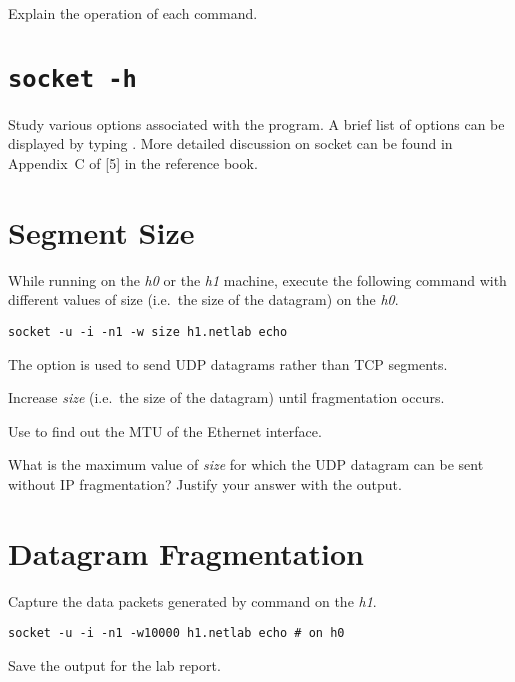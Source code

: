\documentclass{../UTNetLab}
\begin{document}
\begin{report}
    \item Explain the operation of each command.
\end{report}

\section{\texttt{socket -h}}
Study various options associated with the  program.
A brief list of options can be displayed by typing .
More detailed discussion on socket can be found in Appendix~C of [5] in the reference book.

\section{Segment Size}
While running  on the \textit{h0} or the \textit{h1} machine, execute the following command with different values of size (i.e.\  the size of the datagram) on the \textit{h0}.

\begin{lstlisting}[emph={size, h1,netlab},morekeywords={[3]echo}]
socket -u -i -n1 -w size h1.netlab echo
    \end{lstlisting}

The  option is used to send UDP datagrams rather than TCP segments.

Increase \textit{size} (i.e.\  the size of the datagram) until fragmentation occurs.

Use  to find out the MTU of the Ethernet interface.

\begin{report}
    \item What is the maximum value of \textit{size} for which the UDP datagram can be sent without IP fragmentation?
    Justify your answer with the  output.
\end{report}

\section{Datagram Fragmentation}
Capture the data packets generated by  command on the \textit{h1}.

\begin{lstlisting}[emph={h1,netlab},morekeywords={[3]echo}]
socket -u -i -n1 -w10000 h1.netlab echo # on h0
    \end{lstlisting}
Save the  output for the lab report.
\end{document}
